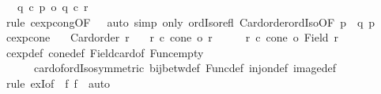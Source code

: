 \begin{isabellebody}
\ \ \ {\isachardoublequoteopen}q\ {\isacharcircum}{\kern0pt}c\ p{}\ {\isacharequal}{\kern0pt}o\ q\ {\isacharcircum}{\kern0pt}c\ r{}{\isachardoublequoteclose}\isanewline
%
\isadelimproof
%
\endisadelimproof
%
\isatagproof
{}\isamarkupfalse%
\ {\isacharparenleft}{\kern0pt}rule\ cexp{\isacharunderscore}{\kern0pt}cong{\isacharbrackleft}{\kern0pt}OF\ {\isacharunderscore}{\kern0pt}\ {}{\isacharbrackright}{\kern0pt}{\isacharparenright}{\kern0pt}\ {\isacharparenleft}{\kern0pt}auto\ simp\ only{\isacharcolon}{\kern0pt}\ ordIso{\isacharunderscore}{\kern0pt}refl\ Card{\isacharunderscore}{\kern0pt}order{\isacharunderscore}{\kern0pt}ordIso{}{\isacharbrackleft}{\kern0pt}OF\ p\ {}{\isacharbrackright}{\kern0pt}\ q\ p{\isacharparenright}{\kern0pt}%
\endisatagproof
{\isafoldproof}%
%
\isadelimproof
\isanewline
%
\endisadelimproof
\isanewline
{}\isamarkupfalse%
\ cexp{\isacharunderscore}{\kern0pt}cone{\isacharcolon}{\kern0pt}\isanewline
\ \ \ {\isachardoublequoteopen}Card{\isacharunderscore}{\kern0pt}order\ r{\isachardoublequoteclose}\isanewline
\ \ \ {\isachardoublequoteopen}r\ {\isacharcircum}{\kern0pt}c\ cone\ {\isacharequal}{\kern0pt}o\ r{\isachardoublequoteclose}\isanewline
%
\isadelimproof
%
\endisadelimproof
%
\isatagproof
{}\isamarkupfalse%
\ {\isacharminus}{\kern0pt}\isanewline
\ \ \isamarkupfalse%
\ {\isachardoublequoteopen}r\ {\isacharcircum}{\kern0pt}c\ cone\ {\isacharequal}{\kern0pt}o\ {\isacharbar}{\kern0pt}Field\ r{\isacharbar}{\kern0pt}{\isachardoublequoteclose}\isanewline
\ \ \ \ \isamarkupfalse%
\ cexp{\isacharunderscore}{\kern0pt}def\ cone{\isacharunderscore}{\kern0pt}def\ Field{\isacharunderscore}{\kern0pt}card{\isacharunderscore}{\kern0pt}of\ Func{\isacharunderscore}{\kern0pt}empty\isanewline
\ \ \ \ \ \ card{\isacharunderscore}{\kern0pt}of{\isacharunderscore}{\kern0pt}ordIso{\isacharbrackleft}{\kern0pt}symmetric{\isacharbrackright}{\kern0pt}\ bij{\isacharunderscore}{\kern0pt}betw{\isacharunderscore}{\kern0pt}def\ Func{\isacharunderscore}{\kern0pt}def\ inj{\isacharunderscore}{\kern0pt}on{\isacharunderscore}{\kern0pt}def\ image{\isacharunderscore}{\kern0pt}def\isanewline
\ \ \ \ \isamarkupfalse%
\ {\isacharparenleft}{\kern0pt}rule\ exI{\isacharbrackleft}{\kern0pt}of\ {\isacharunderscore}{\kern0pt}\ {\isachardoublequoteopen}{\isasymlambda}f{\isachardot}{\kern0pt}\ f\ {\isacharparenleft}{\kern0pt}{\isacharparenright}{\kern0pt}{\isachardoublequoteclose}{\isacharbrackright}{\kern0pt}{\isacharparenright}{\kern0pt}\ auto\isanewline

\end{isabellebody}
